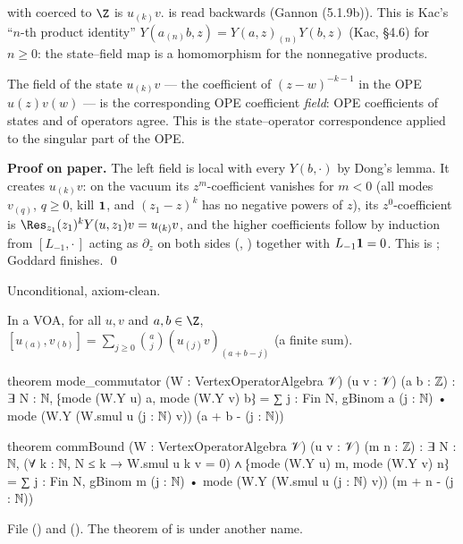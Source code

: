 \begin{dictionary}
 with  coerced to $\Z$ is $u_{(k)}v$.  is
 read backwards (Gannon (5.1.9b)). This is Kac's ``$n$-th product identity'' $Y(a_{(n)}b,z) =
Y(a,z)_{(n)}Y(b,z)$ (Kac, §4.6) for $n\ge0$: the state--field map is a homomorphism for the nonnegative
products.
\end{dictionary}

\begin{physics}
The field of the state $u_{(k)}v$ --- the coefficient of $(z-w)^{-k-1}$ in the OPE $u(z)v(w)$ --- is
the corresponding OPE coefficient \emph{field}: OPE coefficients of states and of operators agree.
This is the state--operator correspondence applied to the singular part of the OPE.
\end{physics}

\textbf{Proof on paper.} The left field is local with every $Y(b,\cdot)$ by Dong's lemma. It
creates $u_{(k)}v$: on the vacuum its $z^m$-coefficient vanishes for $m<0$ (all modes $v_{(q)}$,
$q\ge0$, kill $\mathbf{1}$, and $(z_1-z)^k$ has no negative powers of $z$), its $z^0$-coefficient is
$\Res_{z_1}(z_1)^k Y(u,z_1)v = u_{(k)}v$, and the higher coefficients follow by induction from
$[L_{-1},\cdot\,]$ acting as $\partial_z$ on both sides (,
) together with $L_{-1}\mathbf{1} = 0$. This is ; Goddard
finishes. \qed

\begin{status}
Unconditional, axiom-clean.
\end{status}

\begin{theorem}\label{l03:thm:comm}
In a VOA, for all $u,v$ and $a,b\in\Z$,
$[u_{(a)},v_{(b)}] = \sum_{j\ge0}\binom aj(u_{(j)}v)_{(a+b-j)}$ (a finite sum).
\end{theorem}
\begin{leancode}
theorem mode_commutator (W : VertexOperatorAlgebra 𝒱) (u v : 𝒱) (a b : ℤ) :
    ∃ N : ℕ, ⁅mode (W.Y u) a, mode (W.Y v) b⁆
      = ∑ j : Fin N, gBinom a (j : ℕ) • mode (W.Y (W.smul u (j : ℕ) v)) (a + b - (j : ℕ))

theorem commBound (W : VertexOperatorAlgebra 𝒱) (u v : 𝒱) (m n : ℤ) :
    ∃ N : ℕ, (∀ k : ℕ, N ≤ k → W.smul u k v = 0)
      ∧ ⁅mode (W.Y u) m, mode (W.Y v) n⁆
        = ∑ j : Fin N, gBinom m (j : ℕ) • mode (W.Y (W.smul u (j : ℕ) v)) (m + n - (j : ℕ))
\end{leancode}
File  () and
 (). The theorem
 of  is
 under another name.

